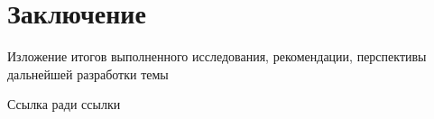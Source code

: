 \chapter*{Заключение} %

Изложение итогов выполненного исследования, рекомендации, перспективы дальнейшей разработки темы

Ссылка ради ссылки \cite{perov10glonass}


